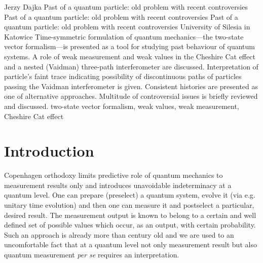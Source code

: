 \begin{artengenv}{Jerzy Dajka}
	{Past of a quantum particle: old problem with recent controversies}
	{Past of a quantum particle: old problem with recent controversies}
	{Past of a quantum particle: old problem with recent controversies}
	{University of Silesia in Katowice}
	{Time-symmetric formulation of quantum mechanics---the two-state vector formalism---is presented  as a tool for studying past behaviour of quantum systems. A role of weak measurement and weak values in the Cheshire Cat effect and a nested (Vaidman) three-path interferometer are discussed. Interpretation of particle's faint trace indicating possibility of discontinuous  paths of particles passing  the Vaidman interferometer is given.   Consistent histories are presented as one of  alternative approaches.  Multitude of controversial issues is briefly reviewed and discussed. }
	{two-state vector formalism, weak values, weak measurement, Cheshire Cat effect}



\section{Introduction}
\lettrine[loversize=0.13,lines=2,lraise=-0.01,nindent=0em,findent=0.2pt]%
{C}{}openhagen orthodoxy limits predictive role of quantum mechanics to measurement results only and introduces unavoidable indeterminacy at a quantum level. One can prepare (preselect) a quantum system, evolve it (via e.g. unitary time evolution) and then one can measure it and postselect a particular, desired result. The measurement output is known to belong to a certain and well defined set of possible values which occur, as an output, with certain probability. Such an approach is already more than century old and we are used to an uncomfortable fact that at a  quantum level not only measurement result but also quantum measurement {\it per se} requires an interpretation. 


\end{artengenv}
